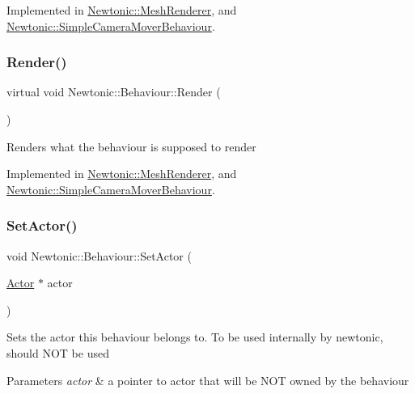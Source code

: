 Implemented in \mbox{\hyperlink{classNewtonic_1_1MeshRenderer_a3a29014cde2e7911162ec729f9d4ed43}{Newtonic\+::\+Mesh\+Renderer}}, and \mbox{\hyperlink{classNewtonic_1_1SimpleCameraMoverBehaviour_ab119794df7ce0e548912caa100b7fcf5}{Newtonic\+::\+Simple\+Camera\+Mover\+Behaviour}}.

\mbox{\label{classNewtonic_1_1Behaviour_ab219950e152ca8b9cb6f54d024667627}} 
\subsubsection{\texorpdfstring{Render()}{Render()}}
{\footnotesize\ttfamily virtual void Newtonic\+::\+Behaviour\+::\+Render (\begin{DoxyParamCaption}{ }\end{DoxyParamCaption})\hspace{0.3cm}{\ttfamily [pure virtual]}}

Renders what the behaviour is supposed to render 

Implemented in \mbox{\hyperlink{classNewtonic_1_1MeshRenderer_a5b996a9b972ba45363c84f667f302217}{Newtonic\+::\+Mesh\+Renderer}}, and \mbox{\hyperlink{classNewtonic_1_1SimpleCameraMoverBehaviour_a52037ac47383855fa58f1fbebbb75e44}{Newtonic\+::\+Simple\+Camera\+Mover\+Behaviour}}.

\mbox{\label{classNewtonic_1_1Behaviour_a22e802f66a36851f9af06f7482d2f283}} 
\subsubsection{\texorpdfstring{SetActor()}{SetActor()}}
{\footnotesize\ttfamily void Newtonic\+::\+Behaviour\+::\+Set\+Actor (\begin{DoxyParamCaption}\item[{\mbox{\hyperlink{classNewtonic_1_1Actor}{Actor}} $\ast$}]{actor }\end{DoxyParamCaption})}

Sets the actor this behaviour belongs to. To be used internally by newtonic, should N\+OT be used 
\begin{DoxyParams}{Parameters}
{\em actor} & a pointer to actor that will be N\+OT owned by the behaviour \\
\hline
\end{DoxyParams}
\mbox{\label{classNewtonic_1_1Behaviour_aaed714f38c7b270381e81958b280d248}} 
